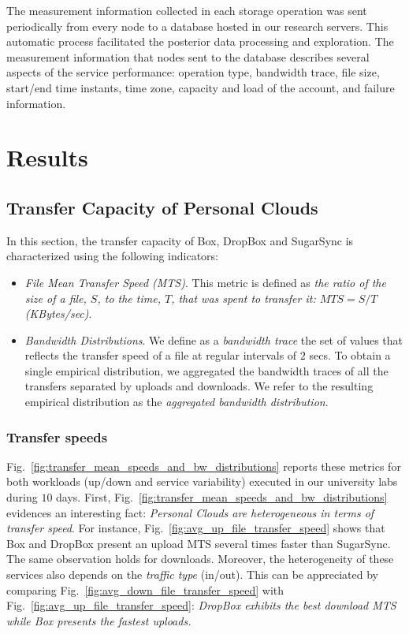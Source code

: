 The measurement information collected in each storage operation
was sent periodically from every node 
to a database hosted in our research servers. This automatic process
facilitated the posterior data processing and exploration. The measurement information
that nodes sent to the database describes several aspects of the service performance:
operation type, bandwidth trace, file size, start/end time instants, 
time zone, capacity and load of the account, and failure information.

\section{Results}

\subsection{Transfer Capacity of Personal Clouds}
In this section, the transfer capacity of Box, DropBox and SugarSync is characterized using the following indicators:
\begin{itemize}
	\item \textit{File Mean Transfer Speed (MTS)}. This metric is defined as \textit{the ratio of
	the size of a file, $S$, to the time, $T$, that was spent to transfer it: $MTS = {S}/{T}$ (KBytes/sec)}. 
	\item \textit{Bandwidth Distributions}. We define as a \textit{bandwidth trace} the set of
	values that reflects the transfer speed of a file at regular intervals of $2$ secs. To
	obtain a single empirical distribution, we aggregated the bandwidth traces of
	all the transfers separated by uploads and downloads. We refer to the resulting empirical
	distribution as the \textit{aggregated bandwidth distribution}.
	 
\end{itemize}

\subsubsection*{Transfer speeds}
Fig.~\ref{fig:transfer_mean_speeds_and_bw_distributions} 
reports these metrics for both workloads (up/down and service
variability) executed in our university labs during $10$ days.
First, Fig.~\ref{fig:transfer_mean_speeds_and_bw_distributions} 
evidences an interesting fact: \textit{Personal Clouds 
are heterogeneous in terms of transfer speed}.
For instance, Fig.~\ref{fig:avg_up_file_transfer_speed} 
shows that Box and DropBox present an upload MTS 
several times faster than SugarSync. The same observation holds for
downloads. Moreover, the heterogeneity of these services also depends
on the \textit{traffic type} (in/out). This can be appreciated by
comparing Fig.~\ref{fig:avg_down_file_transfer_speed} 
with Fig.~\ref{fig:avg_up_file_transfer_speed}: \textit{DropBox exhibits
the best download MTS while Box presents the fastest 
uploads.}

